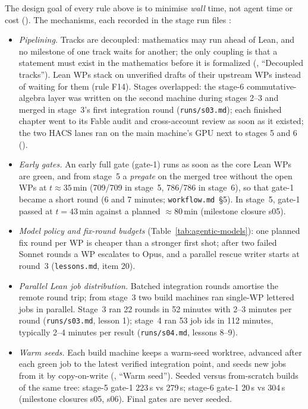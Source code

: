 \begin{sloppypar}
The design goal of every rule above is to minimise \emph{wall} time, not agent time or cost
(). The mechanisms, each recorded in the stage run files
:
\begin{itemize}
\item \emph{Pipelining.} Tracks are decoupled: mathematics may run ahead of Lean, and no milestone of one track waits
for another; the only coupling is that a statement must exist in the mathematics before it is formalized
(, ``Decoupled tracks''). Lean WPs stack on unverified drafts of their upstream WPs instead of
waiting for them (rule F14). Stages overlapped: the stage-6 commutative-algebra layer was written on the second machine
during stages 2--3 and merged in stage~3's first integration round (\texttt{runs/s03.md}); each finished chapter went
to its Fable audit and cross-account review as soon as it existed; the two HACS lanes ran on the main machine's GPU
next to stages 5 and 6 ().
\item \emph{Early gates.} An early full gate (gate-1) runs as soon as the core Lean WPs are green, and from stage~5 a
\emph{pregate} on the merged tree without the open WPs at $t \approx 35$\,min (709/709 in stage~5, 786/786 in stage~6),
so that gate-1 became a short round (6 and 7 minutes; \texttt{workflow.md}~\S5). In stage~5, gate-1 passed at
$t = 43$\,min against a planned $\approx 80$\,min (milestone closure s05).
\item \emph{Model policy and fix-round budgets} (Table~\ref{tab:agentic-models}): one planned fix round per WP is
cheaper than a stronger first shot; after two failed Sonnet rounds a WP escalates to Opus, and a parallel rescue writer
starts at round~3 (\texttt{lessons.md}, item 20).
\item \emph{Parallel Lean job distribution.} Batched integration rounds amortise the remote round trip; from stage~3 two
build machines ran single-WP lettered jobs in parallel. Stage~3 ran 22 rounds in 52 minutes with 2--3 minutes per round
(\texttt{runs/s03.md}, lesson 1); stage~4 ran 53 job ids in 112 minutes, typically 2--4 minutes per result
(\texttt{runs/s04.md}, lessons 8--9).
\item \emph{Warm seeds.} Each build machine keeps a warm-seed worktree, advanced after each green job to the latest
verified integration point, and seeds new jobs from it by copy-on-write
(, ``Warm seed''). Seeded versus from-scratch builds of the same tree:
stage-5 gate-1 223\,s vs 279\,s; stage-6 gate-1 20\,s vs 304\,s (milestone closures s05, s06). Final gates are never
seeded.
\end{itemize}


\end{sloppypar}
